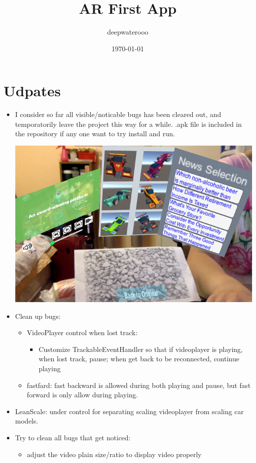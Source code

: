 \documentclass[9pt, b5paper]{article}
\author{deepwaterooo}
\date{\today}
\title{AR First App}
\begin{document}
\maketitle
\tableofcontents


\section{Udpates}
\label{sec-1}
\begin{itemize}
\item I consider so far all visible/noticable bugs has been cleared out, and temporatorily leave the project this way for a while. .apk file is included in the repository if any one want to try install and run. 

\includegraphics[width=.9\linewidth]{./pic/another.png}
\item Clean up bugs: 
\begin{itemize}
\item VideoPlayer control when lost track: 
\begin{itemize}
\item Customize TrackableEventHandler so that if videoplayer is playing, when lost track, pause; when get back to be reconnected, continue playing
\end{itemize}
\item fastfard: fast backward is allowed during both playing and pause, but fast forward is only allow during playing.
\end{itemize}
\item LeanScale: under control for separating scaling videoplayer from scaling car models.
\item Try to clean all bugs that get noticed: 
\begin{itemize}
\item adjust the video plain size/ratio to display video properly

\end{itemize}
\end{itemize}
\end{document}
